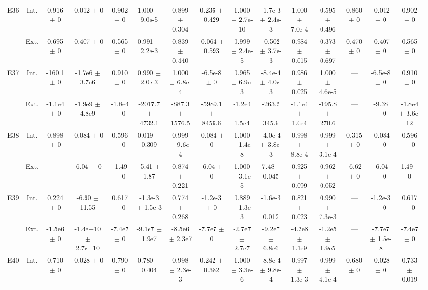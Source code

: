 \begin{table}[htbp]
{\begin{tabular}{@{}ccccccccccccccc@{}}
\cline{2-15}
\multirow{2}{*}{E36} & Int. & 0.916 $\pm$ 0 & -0.012 $\pm$ 0 & 0.902 $\pm$ 0 & 1.000 $\pm$ 9.0e-5 & 0.899 $\pm$ 0.304 & 0.236 $\pm$ 0.429 & 1.000 $\pm$ 2.7e-10 & -1.7e-3 $\pm$ 2.4e-3 & 1.000 $\pm$ 7.0e-4 & 0.595 $\pm$ 0.496 & 0.860 $\pm$ 0 & -0.012 $\pm$ 0 & 0.902 $\pm$ 0 \\
 & Ext. & 0.695 $\pm$ 0 & -0.407 $\pm$ 0 & 0.565 $\pm$ 0 & 0.991 $\pm$ 2.2e-3 & 0.839 $\pm$ 0.440 & -0.064 $\pm$ 0.593 & 0.999 $\pm$ 2.4e-5 & -0.502 $\pm$ 3.7e-3 & 0.984 $\pm$ 0.015 & 0.373 $\pm$ 0.697 & 0.470 $\pm$ 0 & -0.407 $\pm$ 0 & 0.565 $\pm$ 0 \\
\cline{2-15}
\multirow{2}{*}{E37} & Int. & -160.1 $\pm$ 0 & -1.7e6 $\pm$ 3.7e6 & 0.910 $\pm$ 0 & 0.990 $\pm$ 2.0e-3 & 1.000 $\pm$ 6.8e-4 & -6.5e-8 $\pm$ 0 & 0.965 $\pm$ 6.9e-3 & -8.4e-4 $\pm$ 4.0e-3 & 0.986 $\pm$ 0.025 & 1.000 $\pm$ 4.6e-5 & --- & -6.5e-8 $\pm$ 0 & 0.910 $\pm$ 0 \\
 & Ext. & -1.1e4 $\pm$ 0 & -1.9e9 $\pm$ 4.8e9 & -1.8e4 $\pm$ 0 & -2017.7 $\pm$ 4732.1 & -887.3 $\pm$ 1576.5 & -5989.1 $\pm$ 8456.6 & -1.2e4 $\pm$ 1.5e4 & -263.2 $\pm$ 345.9 & -1.1e4 $\pm$ 1.0e4 & -195.8 $\pm$ 270.6 & --- & -9.38 $\pm$ 0 & -1.8e4 $\pm$ 3.6e-12 \\
\cline{2-15}
\multirow{2}{*}{E38} & Int. & 0.898 $\pm$ 0 & -0.084 $\pm$ 0 & 0.596 $\pm$ 0 & 0.019 $\pm$ 0.309 & 0.999 $\pm$ 9.6e-4 & -0.084 $\pm$ 0 & 1.000 $\pm$ 1.4e-8 & -4.0e-4 $\pm$ 3.8e-3 & 0.998 $\pm$ 8.8e-4 & 0.999 $\pm$ 3.1e-4 & 0.315 $\pm$ 0 & -0.084 $\pm$ 0 & 0.596 $\pm$ 0 \\
 & Ext. & --- & -6.04 $\pm$ 0 & -1.49 $\pm$ 0 & -5.41 $\pm$ 1.87 & 0.874 $\pm$ 0.221 & -6.04 $\pm$ 0 & 1.000 $\pm$ 3.1e-5 & -7.48 $\pm$ 0.045 & 0.925 $\pm$ 0.099 & 0.962 $\pm$ 0.052 & -6.62 $\pm$ 0 & -6.04 $\pm$ 0 & -1.49 $\pm$ 0 \\
\cline{2-15}
\multirow{2}{*}{E39} & Int. & 0.224 $\pm$ 0 & -6.90 $\pm$ 11.55 & 0.617 $\pm$ 0 & -1.3e-3 $\pm$ 1.5e-3 & 0.774 $\pm$ 0.268 & -1.2e-3 $\pm$ 0 & 0.889 $\pm$ 1.3e-3 & -1.6e-3 $\pm$ 0.012 & 0.821 $\pm$ 0.023 & 0.990 $\pm$ 7.3e-3 & --- & -1.2e-3 $\pm$ 0 & 0.617 $\pm$ 0 \\
 & Ext. & -1.5e6 $\pm$ 0 & -1.4e+10 $\pm$ 2.7e+10 & -7.4e7 $\pm$ 0 & -9.1e7 $\pm$ 1.9e7 & -8.5e6 $\pm$ 2.3e7 & -7.7e7 $\pm$ 0 & -2.7e7 $\pm$ 2.7e7 & -9.2e7 $\pm$ 6.8e6 & -4.2e8 $\pm$ 1.1e9 & -1.2e5 $\pm$ 1.9e5 & --- & -7.7e7 $\pm$ 1.5e-8 & -7.4e7 $\pm$ 0 \\
\cline{2-15}
\multirow{2}{*}{E40} & Int. & 0.710 $\pm$ 0 & -0.028 $\pm$ 0 & 0.790 $\pm$ 0 & 0.780 $\pm$ 0.404 & 0.998 $\pm$ 2.3e-3 & 0.242 $\pm$ 0.382 & 1.000 $\pm$ 3.3e-6 & -8.8e-4 $\pm$ 9.8e-4 & 0.997 $\pm$ 1.3e-3 & 0.999 $\pm$ 4.1e-4 & 0.680 $\pm$ 0 & -0.028 $\pm$ 0 & 0.733 $\pm$ 0.019 \\

\end{tabular}}
\end{table}
